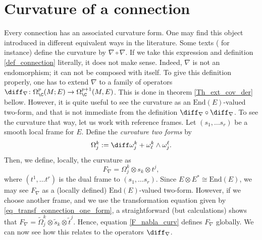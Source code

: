 \section{Curvature of a connection}
Every connection has an associated curvature form. One may find this object introduced in different equivalent ways in the literature. Some texts (\parencite{kobayashi_complex_vector_bundles} for instance) define the curvature by \(\nabla \circ \nabla\). If we take this expression and definition \ref{def_connection} literally, it does not make sense. Indeed, \(\nabla\) is not an endomorphism; it can not be composed with itself. To give this definition properly, one has to extend \(\nabla\) to a family of operators \(\diff_\nabla \colon \Omega_\C^p(M;E)\to \Omega_\C^{p+1}(M,E)\). This is done in theorem \ref{Th_ext_cov_der} bellow. However, it is quite useful to see the curvature as an \(\mathrm{End}(E)\)-valued two-form, and that is not immediate from the definition \(\diff_\nabla\circ \diff_\nabla\). To see the curvature that way, let us work with reference frames. Let \((s_1, \ldots s_r)\) be a smooth local frame for \(E\). Define the \textit{curvature two forms} by 
\begin{equation} \label{def_curv2_forms}
\Omega^k_j:=\diff \omega^k_j+ \omega^k_\ell\wedge \omega^\ell_j.
\end{equation}
Then, we define, locally, the curvature as
\begin{equation} \label{F_nabla_curv}
    F_\nabla = \Omega^k_j \otimes s_k \otimes t^j,
\end{equation}
where \((t^1, \ldots t^r)\) is the dual frame to \((s_1, \ldots s_r)\). Since \(E \otimes E^*\cong \mathrm{End}(E)\), we may see \(F_\nabla\) as a (locally defined) \(\mathrm{End}(E)\)-valued two-form. However, if we choose another frame, and we use the transformation equation given by \eqref{eq_transf_connection_one_form}, a straightforward (but calculations) shows that \(F_\nabla=\tilde{\Omega}^k_j\otimes \tilde{s}_k\otimes \tilde{t}^j\). Hence, equation \eqref{F_nabla_curv} defines \(F_\nabla\) globally. We can now see how this relates to the operators \(\diff_\nabla\). 

